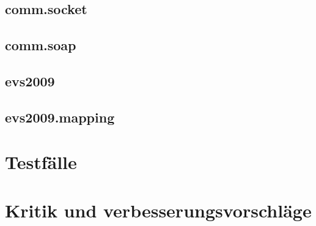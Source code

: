 \documentclass[a4paper]{article}
\begin{document}
	\subsection{comm.socket}
	\subsection{comm.soap}
	\subsection{evs2009}
	\subsection{evs2009.mapping}
\section{Testfälle}
\section{Kritik und verbesserungsvorschläge}

\newpage
{}

		
\end{document}
